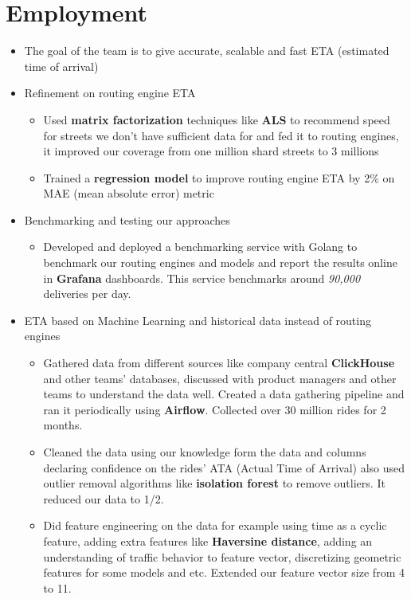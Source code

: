 \section{Employment}

\vspace{0.5cm}

\begin{itemize}
  \item The goal of the team is to give accurate, scalable and fast ETA (estimated time of arrival)
  \item Refinement on routing engine ETA
  \begin{itemize}
    \item Used \textbf{matrix factorization} techniques like \textbf{ALS} to recommend speed for streets we don't have sufficient data for and fed it to routing engines, it improved our coverage from one million shard streets to 3 millions
    \item Trained a \textbf{regression model} to improve routing engine ETA by 2\% on MAE (mean absolute error) metric
  \end{itemize}
  \item Benchmarking and testing our approaches
  \begin{itemize}
    \item Developed and deployed a benchmarking service with Golang to benchmark our routing engines and models and report the results online in \textbf{Grafana} dashboards. This service benchmarks around \textit{90,000} deliveries per day.
  \end{itemize}
  \item ETA based on Machine Learning and historical data instead of routing engines
  \begin{itemize}
    \item Gathered data from different sources like company central \textbf{ClickHouse} and other teams' databases, discussed with product managers and other teams to understand the data well. Created a data gathering pipeline and ran it periodically using \textbf{Airflow}. Collected over 30 million rides for 2 months.
    \item Cleaned the data using our knowledge form the data and columns declaring confidence on the rides' ATA (Actual Time of Arrival) also used outlier removal algorithms like \textbf{isolation forest} to remove outliers. It reduced our data to 1/2.
    \item Did feature engineering on the data for example using time as a cyclic feature, adding extra features like \textbf{Haversine distance}, adding an understanding of traffic behavior to feature vector, discretizing geometric features for some models and etc. Extended our feature vector size from 4 to 11.

\end{itemize}
\end{itemize}
